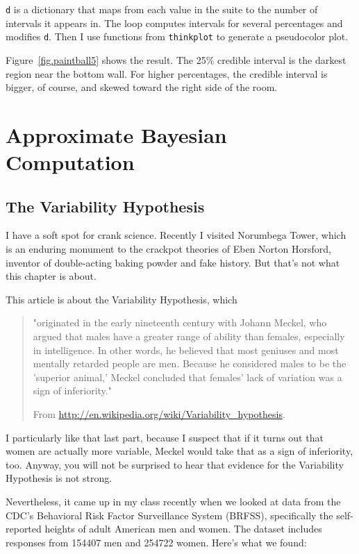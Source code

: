 \documentclass[12pt]{book}
\begin{document}
{\tt d} is a dictionary that maps from each value in the suite
to the number of intervals it appears in.  The loop computes intervals
for several percentages and modifies {\tt d}.  Then I use functions
from {\tt thinkplot} to generate a pseudocolor plot.

Figure~\ref{fig.paintball5} shows the result.  The 25\% credible
interval is the darkest region near the bottom wall.  For higher
percentages, the credible interval is bigger, of course, and skewed
toward the right side of the room.





\chapter{Approximate Bayesian Computation}

\section{The Variability Hypothesis}

I have a soft spot for crank science.  Recently I visited Norumbega
Tower, which is an enduring monument to the crackpot theories of Eben
Norton Horsford, inventor of double-acting baking powder and fake
history.  But that's not what this chapter is about.

This article is about the Variability Hypothesis, which

\begin{quote}
"originated in the early nineteenth century with Johann Meckel, who
  argued that males have a greater range of ability than females,
  especially in intelligence. In other words, he believed that most
  geniuses and most mentally retarded people are men. Because he
  considered males to be the 'superior animal,' Meckel concluded that
  females' lack of variation was a sign of inferiority."

From \url{http://en.wikipedia.org/wiki/Variability_hypothesis}.
\end{quote}

I particularly like that last part, because I suspect that if it turns
out that women are actually more variable, Meckel would take that as a
sign of inferiority, too.  Anyway, you will not be surprised to hear
that evidence for the Variability Hypothesis is not strong.

Nevertheless, it came up in my class recently when we looked at data
from the CDC's Behavioral Risk Factor Surveillance System (BRFSS),
specifically the self-reported heights of adult American men and women.
The dataset includes responses from 154407 men and 254722 women.
Here's what we found:
\end{document}
